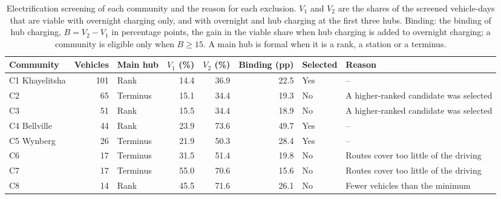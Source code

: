 \begin{table}[htbp]
    \centering
    \footnotesize
    \caption[Electrification screening of each community]{Electrification screening of each community and the reason for each exclusion. $V_1$ and $V_2$ are the shares of the screened vehicle-days that are viable with overnight charging only, and with overnight and hub charging at the first three hubs. Binding: the binding of hub charging, $B = V_2 - V_1$ in percentage points, the gain in the viable share when hub charging is added to overnight charging; a community is eligible only when $B \geq 15$. A main hub is formal when it is a rank, a station or a terminus.}
    \label{tab:screening}
    \begin{tabularx}{\linewidth}{@{}lrlrrrlX@{}}
        \toprule
        \textbf{Community} & Vehicles & Main hub & $V_1$ (\%) & $V_2$ (\%) & Binding (pp) & Selected & Reason \\
        \midrule
        C1 Khayelitsha & 101 & Rank & 14.4 & 36.9 & 22.5 & Yes & -- \\
        C2 & 65 & Terminus & 15.1 & 34.4 & 19.3 & No & A higher-ranked candidate was selected \\
        C3 & 51 & Rank & 15.5 & 34.4 & 18.9 & No & A higher-ranked candidate was selected \\
        C4 Bellville & 44 & Rank & 23.9 & 73.6 & 49.7 & Yes & -- \\
        C5 Wynberg & 26 & Terminus & 21.9 & 50.3 & 28.4 & Yes & -- \\
        C6 & 17 & Terminus & 31.5 & 51.4 & 19.8 & No & Routes cover too little of the driving \\
        C7 & 17 & Terminus & 55.0 & 70.6 & 15.6 & No & Routes cover too little of the driving \\
        C8 & 14 & Rank & 45.5 & 71.6 & 26.1 & No & Fewer vehicles than the minimum \\
        \bottomrule
    \end{tabularx}
\end{table}

